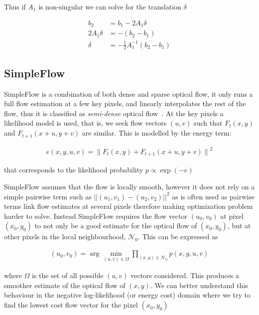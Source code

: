 Thus if $A_1$ is non-singular we can solve for the translation $\delta$

\begin{align*}
b_2 &= b_1 - 2A_1\delta \\
2A_1\delta &= -(b_2-b_1) \\
\delta &= -\frac{1}{2}A_1^{-1}(b_2-b_1)
\end{align*}

\subsection{SimpleFlow}

SimpleFlow is a combination of both dense and sparse optical flow, it only runs a full flow estimation at a few key pixels, and linearly interpolates the rest of the flow, thus it is classified as \textit{semi-dense} optical flow~\citep{simpleflow}. At the key pixels a likelihood model is used, that is, we seek flow vectors $(u,v)$ such that $F_t(x,y)$ and $F_{t+1}(x+u,y+v)$ are similar. This is modelled by the energy term:

\begin{align*}
e(x,y,u,v) = {\lVert F_t(x,y)+F_{t+1}(x+u,y+v)\rVert}^2 
\end{align*}

that corresponds to the likelihood probability $p \propto \exp(-e)$~\citep{rosenberg1997representing}


SimpleFlow assumes that the flow is locally smooth, however it does not rely on a simple pairwise term such as $\left|\left|(u_1,v_1)-(u_2,v_2)\right|\right|^2$ as is often used as pairwise terms link flow estimates at several pixels therefore making optimization problem harder to solve. Instead SimpleFlow requires the flow vector $(u_0,v_0)$ at pixel $(x_0, y_0)$ to not only be a good estimate for the optical flow of $(x_0, y_0)$, but at other pixels in the local neighbourhood, $\mathcal{N}_0$. This can be expressed as

\begin{align*}
  (u_0,v_0) = \arg\min_{(u,v)\in\Omega}\prod_{(x,y)\in\mathcal{N}_0}p(x,y,u,v)
\end{align*}

where $\Omega$ is the set of all possible $(u,v)$ vectors considered. This produces a smoother estimate of the optical flow of $(x, y)$. We can better understand this behaviour in the negative log-likelihood (or energy cost) domain where we try to find the lowest cost flow vector for the pixel $(x_0,y_0)$


